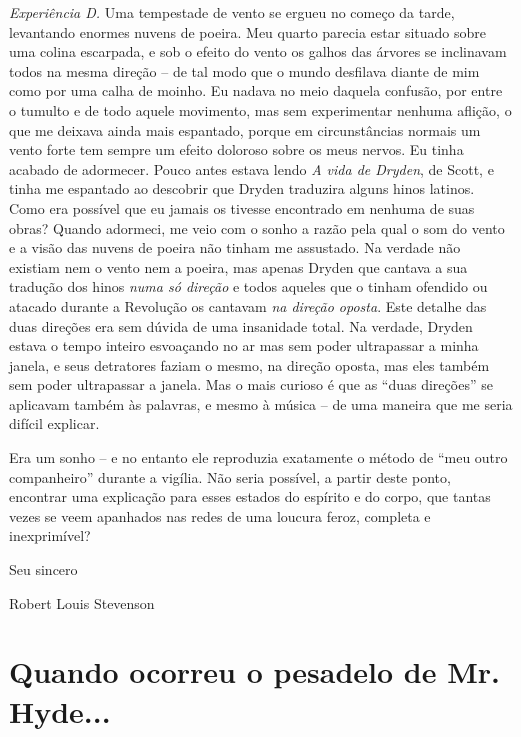 \textit{Experiência D.}  Uma tempestade de vento se ergueu no começo da
tarde, levantando enormes nuvens de poeira. Meu quarto parecia estar
situado sobre uma colina escarpada, e sob o efeito do vento os galhos
das árvores se inclinavam todos na mesma direção -- de tal modo que o
mundo desfilava diante de mim como por uma calha de moinho.  Eu nadava
no meio daquela confusão, por entre o tumulto e de todo aquele
movimento, mas sem experimentar nenhuma aflição, o que me deixava ainda
mais espantado, porque em circunstâncias normais um vento forte tem
sempre um efeito doloroso sobre os meus nervos.  Eu tinha acabado de
adormecer.  Pouco antes estava lendo \textit{A vida de Dryden}, de
Scott, e tinha me espantado ao descobrir que Dryden traduzira alguns
hinos latinos.  Como era possível que eu jamais os tivesse encontrado
em nenhuma de suas obras?  Quando adormeci, me veio com o sonho a razão
pela qual o som do vento e a visão das nuvens de poeira não tinham me
assustado. Na verdade não existiam nem o vento nem a poeira, mas apenas
Dryden que cantava a sua tradução dos hinos \textit{numa só direção} e
todos aqueles que o tinham ofendido ou atacado durante a Revolução os
cantavam \textit{na direção oposta}.  Este detalhe das duas direções
era sem dúvida de uma insanidade total.  Na verdade, Dryden estava o
tempo inteiro esvoaçando no ar mas sem poder ultrapassar a minha
janela, e seus detratores faziam o mesmo, na direção oposta, mas eles
também sem poder ultrapassar a janela.  Mas o mais curioso é que as
“duas direções” se aplicavam também às palavras, e mesmo à música -- de
uma maneira que me seria difícil explicar.

Era um sonho -- e no entanto ele reproduzia exatamente o método de “meu
outro companheiro” durante a vigília.  Não seria possível, a partir
deste ponto, encontrar uma explicação para esses estados do espírito e
do corpo, que tantas vezes se veem apanhados nas redes de uma loucura
feroz, completa e inexprimível? 

\bigskip

Seu sincero

Robert Louis Stevenson


\chapter[Quando ocorreu o pesadelo\\ de Mr. Hyde... --- Lloyd Osbourne]{Quando ocorreu o pesadelo de Mr. Hyde...}

